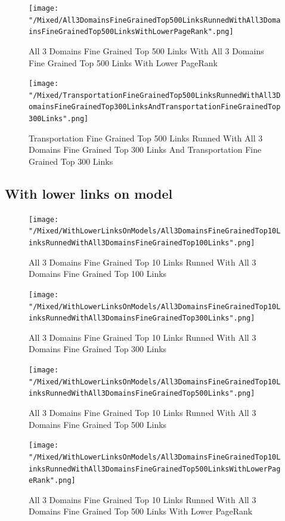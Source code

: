 \documentclass[thesis=M,english]{FITthesis}[2018/05/30]
\begin{document}
	\begin{figure}
		\texttt{[image: "/Mixed/All3DomainsFineGrainedTop500LinksRunnedWithAll3DomainsFineGrainedTop500LinksWithLowerPageRank".png]}		
		\caption{All 3 Domains Fine Grained Top 500 Links With All 3 Domains Fine Grained Top 500 Links With Lower PageRank}
	\end{figure}

	\begin{figure}
		\texttt{[image: "/Mixed/TransportationFineGrainedTop500LinksRunnedWithAll3DomainsFineGrainedTop300LinksAndTransportationFineGrainedTop300Links".png]}		
		\caption{Transportation Fine Grained Top 500 Links Runned With All 3 Domains Fine Grained Top 300 Links And Transportation Fine Grained Top 300 Links}
	\end{figure}	
\subsection{With lower links on model}	
	\begin{figure}[H]\centering
		\texttt{[image: "/Mixed/WithLowerLinksOnModels/All3DomainsFineGrainedTop10LinksRunnedWithAll3DomainsFineGrainedTop100Links".png]}
		\caption{All 3 Domains Fine Grained Top 10 Links Runned With All 3 Domains Fine Grained Top 100 Links}\label{}
	\end{figure}
	
	\begin{figure}[H]\centering
		\texttt{[image: "/Mixed/WithLowerLinksOnModels/All3DomainsFineGrainedTop10LinksRunnedWithAll3DomainsFineGrainedTop300Links".png]}
		\caption{All 3 Domains Fine Grained Top 10 Links Runned With All 3 Domains Fine Grained Top 300 Links}\label{}
	\end{figure}
	
	\begin{figure}[H]\centering
		\texttt{[image: "/Mixed/WithLowerLinksOnModels/All3DomainsFineGrainedTop10LinksRunnedWithAll3DomainsFineGrainedTop500Links".png]}
		\caption{All 3 Domains Fine Grained Top 10 Links Runned With All 3 Domains Fine Grained Top 500 Links}\label{}
	\end{figure}
	
	\begin{figure}[H]\centering
		\texttt{[image: "/Mixed/WithLowerLinksOnModels/All3DomainsFineGrainedTop10LinksRunnedWithAll3DomainsFineGrainedTop500LinksWithLowerPageRank".png]}
		\caption{All 3 Domains Fine Grained Top 10 Links Runned With All 3 Domains Fine Grained Top 500 Links With Lower PageRank}\label{}
	\end{figure}
	
\end{document}
